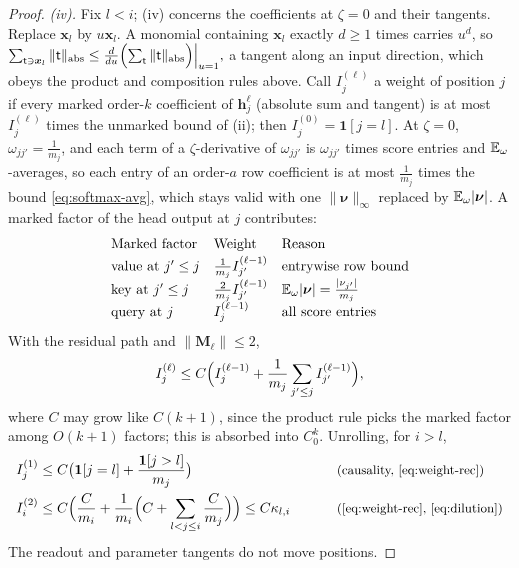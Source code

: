 \begin{proof}
\emph{(iv).} Fix $l<i$; (iv) concerns the coefficients at $\zeta=0$ and their tangents. Replace $\bm x_l$ by $u\bm x_l$. A monomial containing $\bm x_l$
exactly $d\ge1$ times carries $u^d$, so
 $\sum_{\mathsf t\ni\bm x_l}\|\mathsf t\|_{\mathrm{abs}}\le\frac{d}{du}\Bigl(\sum_{\mathsf t}\|\mathsf t\|_{\mathrm{abs}}\Bigr)\Big|_{u=1},$ 
a tangent along an input direction, which obeys the product and composition rules above. Call $I^{(\ell)}_j$ a weight of position $j$ if every
marked order-$k$ coefficient of $\bm h^\ell_j$ (absolute sum and tangent) is at most $I^{(\ell)}_j$ times the unmarked bound of (ii); then
$I^{(0)}_j=\mathbf 1[j=l]$. At $\zeta=0$, $\omega_{jj'}=\frac{1}{m_j}$, and each term of a $\zeta$-derivative of $\omega_{jj'}$ is $\omega_{jj'}$ times score entries and
$\mathbb E_\omega$-averages, so each entry of an order-$a$ row coefficient is at most $\frac{1}{m_j}$ times the bound \cref{eq:softmax-avg}, which stays
valid with one $\|\bm\nu\|_\infty$ replaced by $\mathbb E_\omega|\bm\nu|$. A marked factor of the head output at $j$ contributes:
\[
\begin{array}{@{}lll@{}}
 \text{Marked factor} & \text{Weight} & \text{Reason}\\[2pt]
 \text{value at }j'\le j & \frac{1}{m_j}I^{(\ell-1)}_{j'} & \text{entrywise row bound}\\[2pt]
 \text{key at }j'\le j & \frac{2}{m_j}I^{(\ell-1)}_{j'} & \E_\omega|\bm\nu|=\frac{|\nu_{j'}|}{m_j}\\[2pt]
 \text{query at }j & I^{(\ell-1)}_j & \text{all score entries}
\end{array}
\]
With the residual path and $\|\mathbf M_\ell\|\le2$,
\begin{equation}
 I^{(\ell)}_j\le C\Bigl(I^{(\ell-1)}_j+\frac{1}{m_j}\sum_{j'\le j}I^{(\ell-1)}_{j'}\Bigr),
 \label{eq:weight-rec}
\end{equation}
where $C$ may grow like $C(k+1)$, since the product rule picks the marked factor among $O(k+1)$ factors; this is absorbed into $C_0^k$.
Unrolling, for $i>l$,
\begin{alignat*}{2}
 I^{(1)}_j&\le C\bigl(\mathbf 1[j=l]+\frac{\mathbf 1[j>l]}{m_j}\bigr) &\qquad& \why{causality, \cref{eq:weight-rec}}\\
 I^{(2)}_i&\le C\Bigl(\frac{C}{m_i}+\frac{1}{m_i}\Bigl(C+\sum_{l<j\le i}\frac{C}{m_j}\Bigr)\Bigr)\le C\kappa_{l,i} && \why{\cref{eq:weight-rec}, \cref{eq:dilution}}
\end{alignat*}
The readout and parameter tangents do not move positions.
\end{proof}

